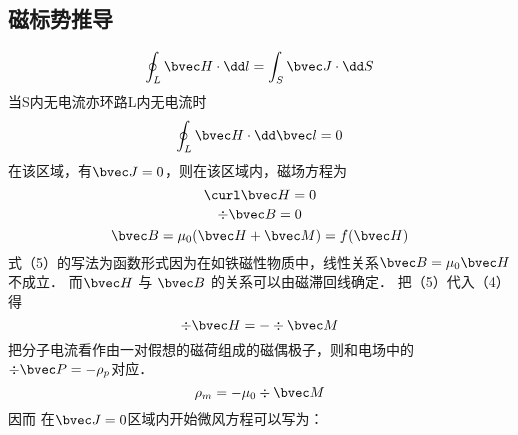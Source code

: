 
\subsection{磁标势推导}
\begin{equation}
\oint_L \bvec H \cdot \dd  l = \int_S \bvec J \cdot \dd S

\end{equation}当S内无电流亦环路L内无电流时
\begin{equation}
\oint_ L\bvec H \cdot \dd \bvec l = 0
\end{equation}
在该区域，有$\bvec J=0$，则在该区域内，磁场方程为 
\begin{equation}
\curl \bvec H =0
\end{equation}
\begin{equation}
\div \bvec B=0
\end{equation}
\begin{equation}
\bvec B=\mu_0(\bvec H+\bvec M)=f(\bvec H)
\end{equation}
式（5）的写法为函数形式因为在如铁磁性物质中，线性关系$\bvec B=\mu_0 \bvec H$不成立．
而$\bvec H$ 与 $\bvec B$ 的关系可以由磁滞回线确定．
把（5）代入（4）得
\begin{equation}
\div \bvec H= - \div \bvec M
\end{equation}
把分子电流看作由一对假想的磁荷组成的磁偶极子，则和电场中的$\div \bvec P=-\rho _p$对应．
\begin{equation}
\rho_m=-\mu_0 \div \bvec M
\end{equation}
因而 在$\bvec J=0$区域内开始微风方程可以写为：




